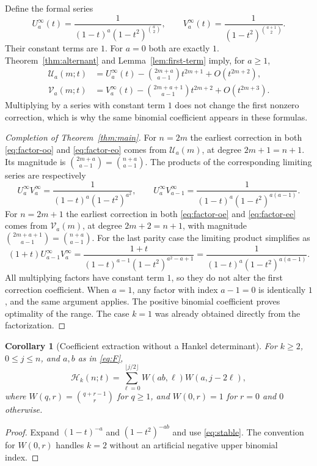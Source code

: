 \documentclass[11pt]{article}
\newtheorem{corollary}[theorem]{Corollary}
\theoremstyle{definition}
\theoremstyle{remark}
\newcommand{\U}{\mathcal U}
\newcommand{\V}{\mathcal V}
\newcommand{\Ht}{\mathcal H}
\theoremstyle{definition}
\theoremstyle{plain}
\numberwithin{equation}{section}
\begin{document}
Define the formal series
\begin{equation}
 U_a^\infty(t)=\frac{1}{(1-t)^a(1-t^2)^{\binom a2}},\qquad
 V_a^\infty(t)=\frac{1}{(1-t^2)^{\binom{a+1}{2}}}.
 \label{eq:limits}
\end{equation}
Their constant terms are $1$. For $a=0$ both are exactly $1$.
Theorem~\ref{thm:alternant} and Lemma~\ref{lem:first-term} imply, for
$a\ge1$,
\begin{align}
 \U_a(m;t)&=U_a^\infty(t)
 -\binom{2m+a}{a-1}t^{2m+1}+O(t^{2m+2}),\label{eq:Udefect}\\
 \V_a(m;t)&=V_a^\infty(t)
 -\binom{2m+a+1}{a-1}t^{2m+2}+O(t^{2m+3}).\label{eq:Vdefect}
\end{align}
Multiplying by a series with constant term $1$ does not change the first
nonzero correction, which is why the same binomial coefficient appears in
these formulas.

\begin{proof}[Completion of Theorem~\ref{thm:main}]
For $n=2m$ the earliest correction in both
\eqref{eq:factor-oo} and \eqref{eq:factor-eo} comes from $\U_a(m)$,
at degree $2m+1=n+1$. Its magnitude is
$\binom{2m+a}{a-1}=\binom{n+a}{a-1}$.
The products of the corresponding limiting series are respectively
\[
 U_a^\infty V_a^\infty
 =\frac1{(1-t)^a(1-t^2)^{a^2}},\qquad
 U_a^\infty V_{a-1}^\infty
 =\frac1{(1-t)^a(1-t^2)^{a(a-1)}}.
\]
For $n=2m+1$ the earliest correction in both
\eqref{eq:factor-oe} and \eqref{eq:factor-ee} comes from $\V_a(m)$,
at degree $2m+2=n+1$, with magnitude
$\binom{2m+a+1}{a-1}=\binom{n+a}{a-1}$.
For the last parity case the limiting product simplifies as
\[
 (1+t)U_{a-1}^\infty V_a^\infty
 =\frac{1+t}{(1-t)^{a-1}(1-t^2)^{a^2-a+1}}
 =\frac1{(1-t)^a(1-t^2)^{a(a-1)}}.
\]
All multiplying factors have constant term $1$, so they do not alter the
first correction coefficient. When $a=1$, any factor with index $a-1=0$
is identically $1$, and the same argument applies. The positive binomial
coefficient proves optimality of the range. The case $k=1$ was already
obtained directly from the factorization.
\end{proof}

\begin{corollary}[Coefficient extraction without a Hankel determinant]
For $k\ge2$, $0\le j\le n$, and $a,b$ as in \eqref{eq:F},
\begin{equation}
 [t^j]\Ht_k(n;t)
 =\sum_{\ell=0}^{\lfloor j/2\rfloor}
 W(ab,\ell)W(a,j-2\ell),
 \label{eq:stable-sum}
\end{equation}
where $W(q,r)=\binom{q+r-1}{r}$ for $q\ge1$, and
$W(0,r)=1$ for $r=0$ and $0$ otherwise.
\end{corollary}
\begin{proof}
Expand $(1-t)^{-a}$ and $(1-t^2)^{-ab}$ and use
\eqref{eq:stable}. The convention for $W(0,r)$ handles $k=2$ without
an artificial negative upper binomial index.
\end{proof}
\end{document}
